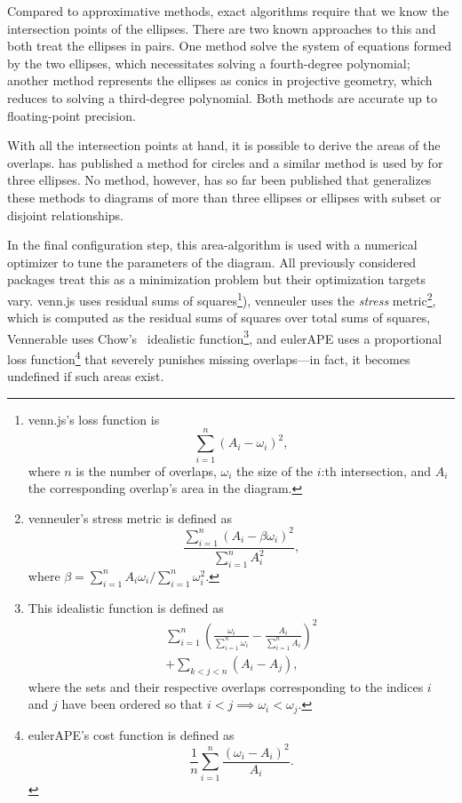 \documentclass[
  oneside,
  openany,
  numbers=noendperiod,
  parskip=half,
  bibliography=totoc
]{scrbook}\usepackage[]{graphicx}\usepackage{xcolor}
\newcommand{\pkg}[1]{{\fontseries{b}\selectfont #1}}
\begin{document}
Compared to approximative methods, exact algorithms require that we
know the intersection points of the ellipses. There are
two known approaches to this and both treat the ellipses in pairs. One method
solve the system of equations formed by the two
ellipses, which necessitates solving a fourth-degree
polynomial; another method represents the ellipses as
conics in projective geometry, which reduces to solving a third-degree polynomial.
Both methods are accurate up to floating-point precision.

With all the intersection points at hand, it is possible to derive the areas of the overlaps.
\citet{Frederickson_2013} has published a method for circles
and a similar method is used by \citet{Micallef_2014a} for three ellipses. No
method, however, has so far been published that
generalizes these methods to diagrams of more than three ellipses or ellipses
with subset or disjoint relationships.

In the final configuration step, this area-algorithm is used with a numerical optimizer
to tune the parameters of the diagram. All previously considered packages
treat this as a minimization problem but their optimization targets vary.
\pkg{venn.js} uses residual sums of squares\footnote{
\pkg{venn.js}'s loss function is
\[
\sum_{i=1}^n \left( A_i - \omega_i \right)^2,
\]
where $n$ is the number of overlaps, $\omega_i$ the size of the $i$:th intersection,
and $A_i$ the corresponding overlap's area in the diagram.
}), \pkg{venneuler} uses the \emph{stress} metric\footnote{\pkg{venneuler}'s
stress metric is defined as
\[
 \frac{\sum_{i=1}^n (A_i - \beta \omega_i)^2}{\sum_{i=1}^n A_i^2},
\]
where $\beta = \sum_{i=1}^n A_i\omega_i/\sum_{i=1}^n \omega_i^2$.
}, which is computed as the residual sums of squares over total sums of squares,
\pkg{Vennerable}
uses Chow's~\citep{Chow_2005} idealistic function\footnote{
This idealistic function is defined as
\begin{multline*}
\sum_{i=1}^n \left( \frac{\omega_i}{\sum_{i=1}^n \omega_i} - \frac{A_i}{\sum_{i=1}^n A_i} \right)^2\\
  + \sum_{k < j < n} \left( A_i - A_j\right),
\end{multline*}
where the sets and their respective overlaps corresponding to the indices
$i$ and $j$ have been ordered so that $i < j \implies \omega_i < \omega_j$.
}, and \pkg{eulerAPE} uses a
proportional loss function\footnote{\pkg{eulerAPE}'s cost function is
defined as \[\frac{1}{n}\sum_{i = 1}^n \frac{\left(\omega_i-A_i\right)^2}{A_i}.\]
}
that severely punishes missing overlaps---in fact, it becomes undefined if such
areas exist.
\end{document}
